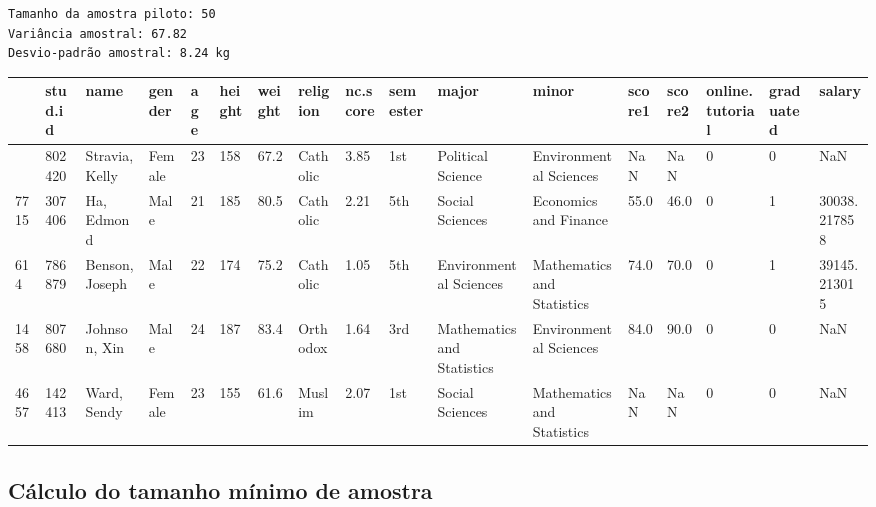 \documentclass[
  letterpaper,
  DIV=11,
  numbers=noendperiod]{scrreprt}
\begin{document}
\begin{verbatim}
Tamanho da amostra piloto: 50
Variância amostral: 67.82
Desvio-padrão amostral: 8.24 kg
\end{verbatim}

\begin{longtable}[]{@{}lllllllllllllllll@{}}
\toprule\noalign{}
& stud.id & name & gender & age & height & weight & religion & nc.score
& semester & major & minor & score1 & score2 & online.tutorial &
graduated & salary \\
\midrule\noalign{}
\endhead
\bottomrule\noalign{}
\endlastfoot
3165 & 802420 & Stravia, Kelly & Female & 23 & 158 & 67.2 & Catholic &
3.85 & 1st & Political Science & Environmental Sciences & NaN & NaN & 0
& 0 & NaN \\
7715 & 307406 & Ha, Edmond & Male & 21 & 185 & 80.5 & Catholic & 2.21 &
5th & Social Sciences & Economics and Finance & 55.0 & 46.0 & 0 & 1 &
30038.217858 \\
614 & 786879 & Benson, Joseph & Male & 22 & 174 & 75.2 & Catholic & 1.05
& 5th & Environmental Sciences & Mathematics and Statistics & 74.0 &
70.0 & 0 & 1 & 39145.213015 \\
1458 & 807680 & Johnson, Xin & Male & 24 & 187 & 83.4 & Orthodox & 1.64
& 3rd & Mathematics and Statistics & Environmental Sciences & 84.0 &
90.0 & 0 & 0 & NaN \\
4657 & 142413 & Ward, Sendy & Female & 23 & 155 & 61.6 & Muslim & 2.07 &
1st & Social Sciences & Mathematics and Statistics & NaN & NaN & 0 & 0 &
NaN \\
\end{longtable}

\subsection{Cálculo do tamanho mínimo de
amostra}\label{cuxe1lculo-do-tamanho-muxednimo-de-amostra-1}
\end{document}
